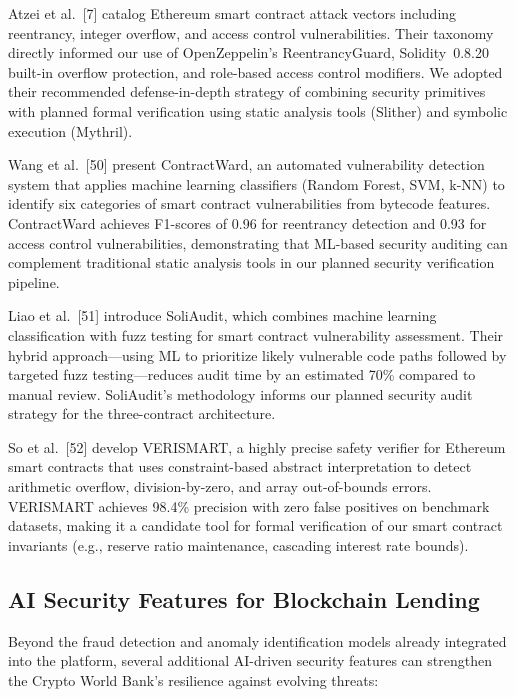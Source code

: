 \documentclass[12pt,a4paper]{report}
\begin{document}
Atzei et al.~[7] catalog Ethereum smart contract attack vectors including reentrancy, integer overflow, and access control vulnerabilities. Their taxonomy directly informed our use of OpenZeppelin's ReentrancyGuard, Solidity~0.8.20 built-in overflow protection, and role-based access control modifiers. We adopted their recommended defense-in-depth strategy of combining security primitives with planned formal verification using static analysis tools (Slither) and symbolic execution (Mythril).

Wang et al.~[50] present ContractWard, an automated vulnerability detection system that applies machine learning classifiers (Random Forest, SVM, k-NN) to identify six categories of smart contract vulnerabilities from bytecode features. ContractWard achieves F1-scores of 0.96 for reentrancy detection and 0.93 for access control vulnerabilities, demonstrating that ML-based security auditing can complement traditional static analysis tools in our planned security verification pipeline.

Liao et al.~[51] introduce SoliAudit, which combines machine learning classification with fuzz testing for smart contract vulnerability assessment. Their hybrid approach---using ML to prioritize likely vulnerable code paths followed by targeted fuzz testing---reduces audit time by an estimated 70\% compared to manual review. SoliAudit's methodology informs our planned security audit strategy for the three-contract architecture.

So et al.~[52] develop VERISMART, a highly precise safety verifier for Ethereum smart contracts that uses constraint-based abstract interpretation to detect arithmetic overflow, division-by-zero, and array out-of-bounds errors. VERISMART achieves 98.4\% precision with zero false positives on benchmark datasets, making it a candidate tool for formal verification of our smart contract invariants (e.g., reserve ratio maintenance, cascading interest rate bounds).

\subsection{AI Security Features for Blockchain Lending}

Beyond the fraud detection and anomaly identification models already integrated into the platform, several additional AI-driven security features can strengthen the Crypto World Bank's resilience against evolving threats:
\end{document}
